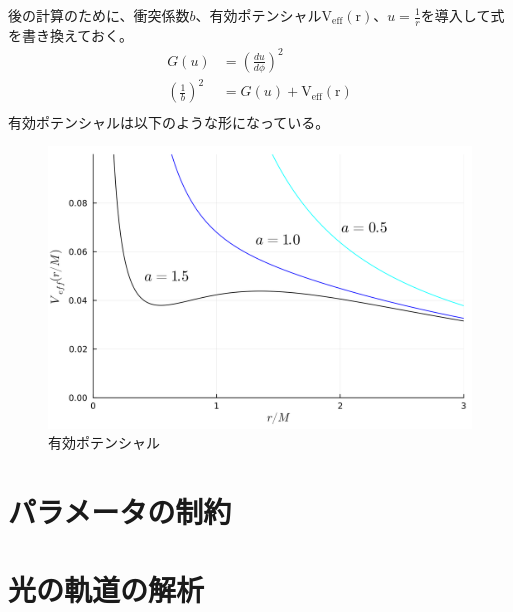 \documentclass[dvipdfmx]{report} %
\begin{document}
後の計算のために、衝突係数$b$、有効ポテンシャル$\mathrm{V_{eff}(r)}$、$u=\frac{1}{r}$を導入して式を書き換えておく。
\begin{equation*}
\begin{split}
	G(u) 	&= \left( \frac{du}{d\phi} \right)^2\\ 
	\left( \frac{1}{b} \right)^2 &=
			G(u)
			+ \mathrm{V_{eff}(r)}\\
\end{split}
\end{equation*}
有効ポテンシャルは以下のような形になっている。
\begin{figure}[H]
    \centering
    \includegraphics[width=0.5\columnwidth]{./images/buch/v-eff.png}
    \caption{有効ポテンシャル}
    \label{}
\end{figure}

\section{パラメータの制約}

\section{光の軌道の解析}
\end{document}
